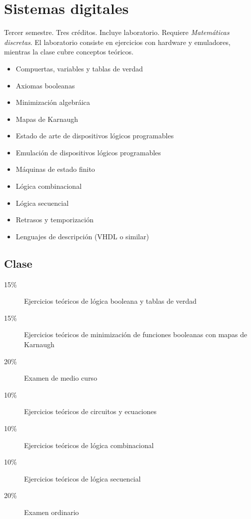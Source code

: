 \documentclass{article}
\begin{document}
\begin{multicols}{4}
\vfill\null \columnbreak

\hypertarget{sd}{\section*{Sistemas digitales}}

Tercer semestre. Tres cr\'{e}ditos. Incluye laboratorio. Requiere {\em
  Matem\'{a}ticas discretas}. El laboratorio consiste en ejercicios
con hardware y emuladores, mientras la clase cubre conceptos te\'{o}ricos.

\begin{itemize}
\item{Compuertas, variables y tablas de verdad}
\item{Axiomas booleanas}
\item{Minimizaci\'{o}n algebr\'{a}ica}
\item{Mapas de Karnaugh}
\item{Estado de arte de dispositivos l\'{o}gicos programables}
\item{Emulaci\'{o}n de dispositivos l\'{o}gicos programables}
\item{M\'{a}quinas de estado finito}
\item{L\'{o}gica combinacional}
\item{L\'{o}gica secuencial}  
\item{Retrasos y temporizaci\'{o}n}
\item{Lenguajes de descripci\'{o}n (VHDL o similar)}
\end{itemize}

\subsection*{Clase}

\begin{description}
\item[15\%]{Ejercicios te\'{o}ricos de l\'{o}gica booleana y tablas de
  verdad}
\item[15\%]{Ejercicios te\'{o}ricos de minimizaci\'{o}n de funciones booleanas
  con mapas de Karnaugh}
\item[20\%]{Examen de medio curso}
\item[10\%]{Ejercicios te\'{o}ricos de circuitos y ecuaciones}
\item[10\%]{Ejercicios te\'{o}ricos de l\'{o}gica combinacional}
\item[10\%]{Ejercicios te\'{o}ricos de l\'{o}gica secuencial}  
\item[20\%]{Examen ordinario}
\end{description}


\end{multicols}
\end{document}
